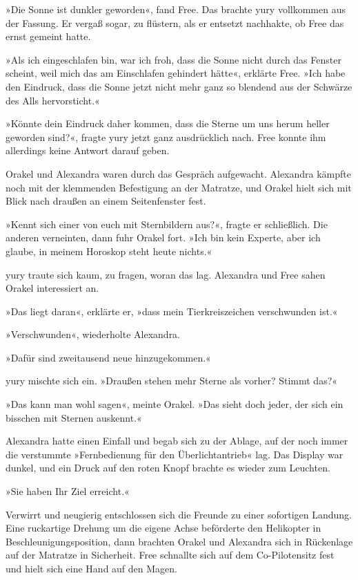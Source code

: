 »Die Sonne ist dunkler geworden«, fand Free. Das brachte yury vollkommen aus der Fassung. Er vergaß sogar, zu flüstern, als er entsetzt nachhakte, ob Free das ernst gemeint hatte.

»Als ich eingeschlafen bin, war ich froh, dass die Sonne nicht durch das Fenster scheint, weil mich das am Einschlafen gehindert hätte«, erklärte Free. »Ich habe den Eindruck, dass die Sonne jetzt nicht mehr ganz so blendend aus der Schwärze des Alls hervorsticht.«

»Könnte dein Eindruck daher kommen, dass die Sterne um uns herum heller geworden sind?«, fragte yury jetzt ganz ausdrücklich nach. Free konnte ihm allerdings keine Antwort darauf geben.

Orakel und Alexandra waren durch das Gespräch aufgewacht. Alexandra kämpfte noch mit der klemmenden Befestigung an der Matratze, und Orakel hielt sich mit Blick nach draußen an einem Seitenfenster fest.

»Kennt sich einer von euch mit Sternbildern aus?«, fragte er schließlich. Die anderen verneinten, dann fuhr Orakel fort. »Ich bin kein Experte, aber ich glaube, in meinem Horoskop steht heute nichts.«

yury traute sich kaum, zu fragen, woran das lag. Alexandra und Free sahen Orakel interessiert an.

»Das liegt daran«, erklärte er, »dass mein Tierkreiszeichen verschwunden ist.«

»Verschwunden«, wiederholte Alexandra.

»Dafür sind zweitausend neue hinzugekommen.«

yury mischte sich ein. »Draußen stehen mehr Sterne als vorher? Stimmt das?«

»Das kann man wohl sagen«, meinte Orakel. »Das sieht doch jeder, der sich ein bisschen mit Sternen auskennt.«

Alexandra hatte einen Einfall und begab sich zu der Ablage, auf der noch immer die verstummte »Fernbedienung für den Überlichtantrieb« lag. Das Display war dunkel, und ein Druck auf den roten Knopf brachte es wieder zum Leuchten.

»Sie haben Ihr Ziel erreicht.«

Verwirrt und neugierig entschlossen sich die Freunde zu einer sofortigen Landung. Eine ruckartige Drehung um die eigene Achse beförderte den Helikopter in Beschleunigungsposition, dann brachten Orakel und Alexandra sich in Rückenlage auf der Matratze in Sicherheit. Free schnallte sich auf dem Co-Pilotensitz fest und hielt sich eine Hand auf den Magen.

